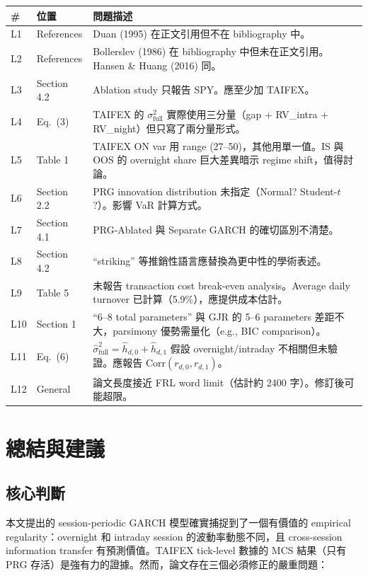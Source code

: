 \documentclass[12pt,a4paper]{article}
\begin{document}
\begin{longtable}{p{0.5cm}p{2cm}p{11cm}}
\toprule
\# & 位置 & 問題描述 \\
\midrule
\endhead
L1 & References & Duan (1995) 在正文引用但不在 bibliography 中。 \\
L2 & References & Bollerslev (1986) 在 bibliography 中但未在正文引用。Hansen \& Huang (2016) 同。 \\
L3 & Section 4.2 & Ablation study 只報告 SPY。應至少加 TAIFEX。 \\
L4 & Eq.~(3) & TAIFEX 的 $\sigma^2_\text{full}$ 實際使用三分量（gap + RV\_intra + RV\_night）但只寫了兩分量形式。 \\
L5 & Table 1 & TAIFEX ON var 用 range (27--50)，其他用單一值。IS 與 OOS 的 overnight share 巨大差異暗示 regime shift，值得討論。 \\
L6 & Section 2.2 & PRG innovation distribution 未指定（Normal? Student-$t$?）。影響 VaR 計算方式。 \\
L7 & Section 4.1 & PRG-Ablated 與 Separate GARCH 的確切區別不清楚。 \\
L8 & Section 4.2 & ``striking'' 等推銷性語言應替換為更中性的學術表述。 \\
L9 & Table 5 & 未報告 transaction cost break-even analysis。Average daily turnover 已計算（5.9\%），應提供成本估計。 \\
L10 & Section 1 & ``6--8 total parameters'' 與 GJR 的 5--6 parameters 差距不大，parsimony 優勢需量化（e.g., BIC comparison）。 \\
L11 & Eq.~(6) & $\hat{\sigma}^2_\text{full} = \hat{h}_{d,0} + \hat{h}_{d,1}$ 假設 overnight/intraday 不相關但未驗證。應報告 $\text{Corr}(r_{d,0}, r_{d,1})$。 \\
L12 & General & 論文長度接近 FRL word limit（估計約 2400 字）。修訂後可能超限。 \\
\bottomrule
\end{longtable}


\section{總結與建議}

\subsection*{核心判斷}

本文提出的 session-periodic GARCH 模型確實捕捉到了一個有價值的 empirical regularity：overnight 和 intraday session 的波動率動態不同，且 cross-session information transfer 有預測價值。TAIFEX tick-level 數據的 MCS 結果（只有 PRG 存活）是強有力的證據。然而，論文存在三個必須修正的嚴重問題：
\end{document}
